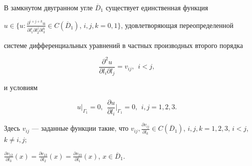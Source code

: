 \begin{lem}


В замкнутом двугранном угле $\overline D_1$ существует единственная функция


$u \in \big \{u:\frac {\partial^{i+j+k}u}{\partial l_1^i \partial l_2^j


\partial l_3^k} 


\in C(\overline D_1)$, $i,j,k=0,1\big \}$, удовлетворяющая переопределенной


системе дифференциальных уравнений в частных производных второго порядка




\begin{equation}


\frac{\partial^{2}u}{\partial l_i \partial l_j} = v_{ij},\ \ i<j,


\end{equation}


и условиям




\begin{equation}


u{\big|}_{\Gamma_1}=0,


\ \ \frac{\partial u}{\partial l_i}{\Big |}_{\Gamma_1}=0,


\ \ i,j=1,2,3.


\end{equation}


Здесь $v_{ij}$ --- заданные функции такие, что $v_{ij},\frac{\partial v_{ij}}


{\partial l_k} \in C(\overline D_1)$, $i,j,k=1,2,3$, $i<j$, $k \neq i,j;$


$\frac{\partial v_{12}}{\partial l_3}(x)=\frac{\partial v_{13}}{\partial l_2}


(x)=\frac{\partial v_{23}}{\partial l_1}(x)$, $x \in \overline D_1$.


\end{lem}





